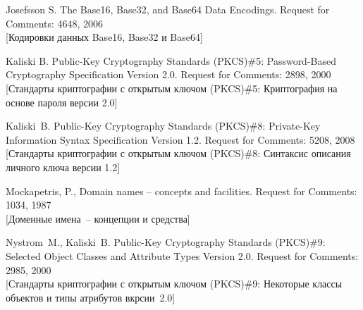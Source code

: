 \begin{thebibliography}{9}
Josefsson S. The Base16, Base32, and Base64 Data Encodings. 
Request for Comments: 4648, 2006\\
{\small [Кодировки данных Base16, Base32 и Base64]} 

Kaliski B. 
Public-Key Cryptography Standards (PKCS)\#5: 
Password-Based Cryptography Specification Version 2.0. 
Request for Comments: 2898, 2000\\ 
{\small [Стандарты криптографии с открытым ключом (PKCS)\#5: 
Криптография на основе пароля версии 2.0]}  

Kaliski~B. 
Public-Key Cryptography Standards (PKCS)\#8: 
Private-Key Information Syntax Specification Version 1.2. 
Request for Comments: 5208, 2008\\ 
{\small [Стандарты криптографии с открытым ключом (PKCS)\#8: 
Синтаксис описания личного ключа версии 1.2]}  

Mockapetris, P., Domain names -- concepts and facilities. 
Request for Comments: 1034, 1987\\ 
{\small [Доменные имена~-- концепции и средства]} 

Nystrom~M., Kaliski~B. 
Public-Key Cryptography Standards (PKCS)\#9: 
Selected Object Classes and Attribute Types Version 2.0. Request for 
Comments: 2985, 2000\\ 
{\small [Стандарты криптографии с открытым ключом (PKCS)\#9: 
Некоторые классы объектов и типы атрибутов вкрсии~2.0]}  
\label{LastBib}
\end{thebibliography}

